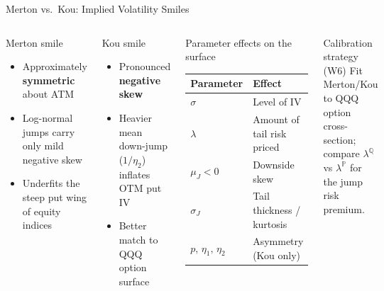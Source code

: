 \documentclass[aspectratio=169,10pt]{beamer}
\begin{document}
\begin{frame}{Merton vs.\ Kou: Implied Volatility Smiles}
\begin{columns}[T]
\begin{block}{Merton smile}
\footnotesize
\begin{itemize}\itemsep2pt
  \item Approximately \textbf{symmetric} about ATM
  \item Log-normal jumps carry only mild negative skew
  \item Underfits the steep put wing of equity indices
\end{itemize}
\end{block}

\medskip
\begin{block}{Kou smile}
\footnotesize
\begin{itemize}\itemsep2pt
  \item Pronounced \textbf{negative skew}
  \item Heavier mean down-jump ($1/\eta_2$) inflates OTM put IV
  \item Better match to QQQ option surface
\end{itemize}
\end{block}

\begin{block}{Parameter effects on the surface}
\footnotesize
\begin{tabular}{lp{3.2cm}}
\toprule
Parameter & Effect \\
\midrule
$\sigma$ & Level of IV \\
$\lambda$ & Amount of tail risk priced \\
$\mu_J < 0$ & Downside skew \\
$\sigma_J$ & Tail thickness / kurtosis \\
$p,\,\eta_1,\,\eta_2$ & Asymmetry (Kou only) \\
\bottomrule
\end{tabular}
\end{block}

\begin{alertblock}{Calibration strategy (W6)}
\footnotesize Fit Merton/Kou to QQQ option cross-section; compare $\lambda^{\mathbb{Q}}$ vs $\lambda^{\mathbb{P}}$ for the jump risk premium.
\end{alertblock}
\end{columns}
\end{frame}

\end{document}
